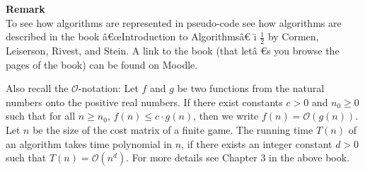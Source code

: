 \documentclass[a4paper,parskip=half]{scrartcl}
\newenvironment{remark}{\large \textsf{\textbf{Remark}} \\ \normalsize}{\vspace{2ex}}
\begin{document}
\begin{remark}
To see how algorithms are represented in pseudo-code see how algorithms are
described in the book \^{a}\euro \oe Introduction to Algorithms\^{a}\euro 
\"{\i}\textquestiondown 
$\frac12$
by Cormen, Leiserson, Rivest, and Stein. A link to the book (that let\^{a}%
\euro \texttrademark s you browse the pages of the book) can be found on
Moodle.

Also recall the $\mathcal{O}$-notation: Let $f$ and $g$ be two functions
from the natural numbers onto the positive real numbers. If there exist
constants $c>0$ and $n_{0}\geq 0$ such that for all $n\geq n_{0}$, $f(n)\leq
c\cdot g(n)$, then we write $f(n)=\mathcal{O}(g(n))$. Let $n$ be the size of
the cost matrix of a finite game. The running time $T(n)$ of an algorithm
takes time polynomial in $n$, if there exists an integer constant $d>0$ such
that $T(n)=\mathcal{O}(n^{d})$. For more details see Chapter 3 in the above
book.
\end{remark}
\end{document}
